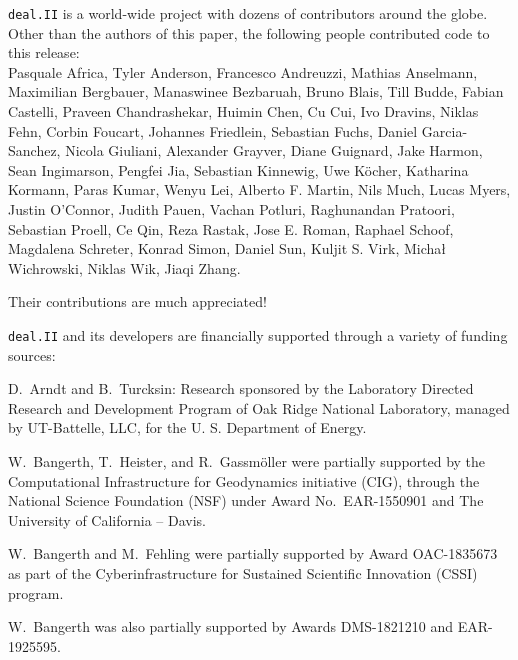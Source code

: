 \documentclass{ansarticle-preprint}
\newcommand{\specialword}[1]{\texttt{#1}}
\newcommand{\dealii}{{\specialword{deal.II}}\xspace}
\begin{document}
\dealii{} is a world-wide project with dozens of contributors around the
globe. Other than the authors of this paper, the following people
contributed code to this release:\\
%
%

Pasquale      Africa,
Tyler         Anderson,
Francesco     Andreuzzi,
Mathias       Anselmann,
Maximilian    Bergbauer,
Manaswinee    Bezbaruah,
Bruno         Blais,
Till          Budde,
Fabian        Castelli,
Praveen       Chandrashekar,
Huimin        Chen,
Cu            Cui,
Ivo           Dravins,
Niklas        Fehn,
Corbin        Foucart,
Johannes      Friedlein,
Sebastian     Fuchs,
Daniel        Garcia-Sanchez,
Nicola        Giuliani,
Alexander     Grayver,
Diane         Guignard,
Jake          Harmon,
Sean          Ingimarson,
Pengfei       Jia,
Sebastian     Kinnewig,
Uwe           K{\"o}cher,
Katharina     Kormann,
Paras         Kumar,
Wenyu         Lei,
Alberto F.    Martin,
Nils          Much,
Lucas         Myers,
Justin        O'Connor,
Judith        Pauen,
Vachan        Potluri,
Raghunandan   Pratoori,
Sebastian     Proell,
Ce            Qin,
Reza          Rastak,
Jose E.       Roman,
Raphael       Schoof,
Magdalena     Schreter,
Konrad        Simon,
Daniel        Sun,
Kuljit S.     Virk,
Michał        Wichrowski,
Niklas        Wik,
Jiaqi         Zhang.


Their contributions are much appreciated!


\bigskip

\dealii{} and its developers are financially supported through a
variety of funding sources:


D.~Arndt and B.~Turcksin: Research sponsored by the Laboratory Directed Research and
Development Program of Oak Ridge National Laboratory, managed by UT-Battelle,
LLC, for the U. S. Department of Energy.

W.~Bangerth, T.~Heister, and R.~Gassm{\"o}ller were partially
supported by the Computational Infrastructure for Geodynamics initiative
(CIG), through the National Science Foundation (NSF) under Award
No.~EAR-1550901 and The University of California -- Davis.

W.~Bangerth and M.~Fehling were partially supported by Award OAC-1835673
as part of the Cyberinfrastructure for Sustained Scientific Innovation (CSSI)
program.

W.~Bangerth was also partially supported by Awards DMS-1821210 and EAR-1925595.
\end{document}
